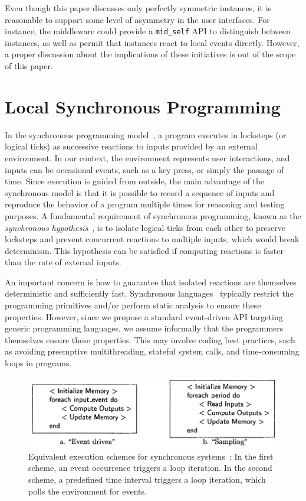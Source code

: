 \documentclass[sigplan,screen]{acmart}
\begin{document}
Even though this paper discusses only perfectly symmetric instances, it is
reasonable to support some level of asymmetry in the user interfaces.
For instance, the middleware could provide a \texttt{mid\_self} API to
distinguish between instances, as well as permit that instances react to local
events directly.
However, a proper discussion about the implications of these initiatives is out
of the scope of this paper.

\section{Local Synchronous Programming}
\label{sec.sync}

In the synchronous programming model~\cite{sync}, a program executes in
locksteps (or logical ticks) as successive reactions to inputs provided by an
external environment.
In our context, the environment represents user interactions, and inputs can be
occasional events, such as a key press, or simply the passage of time.
Since execution is guided from outside, the main advantage of the synchronous
model is that it is possible to record a sequence of inputs and reproduce the
behavior of a program multiple times for reasoning and testing purposes.
A fundamental requirement of synchronous programming, known as the
\emph{synchronous hypothesis}~\cite{hypo}, is to isolate logical ticks from
each other to preserve locksteps and prevent concurrent reactions to multiple
inputs, which would break determinism.
This hypothesis can be satisfied if computing reactions is faster than the rate
of external inputs.

An important concern is how to guarantee that isolated reactions are themselves
deterministic and sufficiently fast.
Synchronous languages~\cite{langs} typically restrict the programming
primitives and/or perform static analysis to ensure these properties.
However, since we propose a standard event-driven API targeting generic
programming languages, we assume informally that the programmers themselves
ensure these properties.
This may involve coding best practices, such as avoiding preemptive
multithreading, stateful system calls, and time-consuming loops in programs.

\begin{figure}[t]
  \centering
  \includegraphics[width=\linewidth]{schemes}
  \caption{
    \label{fig.schemes}
    Equivalent execution schemes for synchronous systems~\cite{schemes}:
    In the first scheme, an event occurrence triggers a loop iteration.
    In the second scheme, a predefined time interval triggers a loop iteration,
    which polls the environment for events.
  }
\end{figure}
\end{document}
